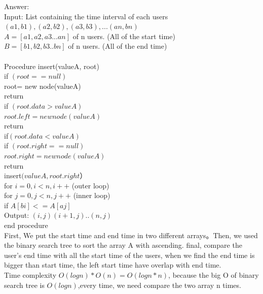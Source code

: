 \documentclass[12pt]{article}
\begin{document}
\begin{enumerate}
\begin{enumerate}
    {\color{blue}Answer:
    \\Input: List containing the time interval of each users {$(a1,b1),(a2, b2), (a3,b3), ... (an,bn)$}
    \\$A = [a1,a2,a3...an]$ of n users. (All of the start time)
    \\$B = [b1,b2, b3..bn]$ of n users. (All of the end time)
    \\
   \\ Procedure  insert(valueA, root) 
   \\if $(root==null)$
   \\root= new node(valueA)
   \\return
   \\if $(root.data> valueA)$ 
   \\$root.left = new node(valueA)$
    \\return
    \\if$( root.data < valueA)$ 
    \\ if $(root.right==null)$
    \\$root.right = new node(valueA)$
    \\return
    \\insert$(valueA, root.right）$
    \\for $i = 0, i < n, i++$ (outer loop)
    \\ for $j= 0, j < n, j++$ (inner loop)
    \\ if $A[bi] <= A[aj]$
    \\Output: $(i,j)(i+1,j)..(n,j)$
    \\end procedure
    \\First, We put the start time and end time in two different arrays。Then, we used the binary search tree to sort the array A with ascending. final, compare the user's end time with all the start time of the users, when we find the end time is bigger than start time, the left start time have overlap with end time. 
    \\Time complexity $O(logn)*O(n)= O(logn*n)$, because the big O of binary search tree is $O(logn)$,every time, we need compare the two array n times.
  

    
    }
    
  \end{enumerate}


\end{enumerate}
\end{document}

